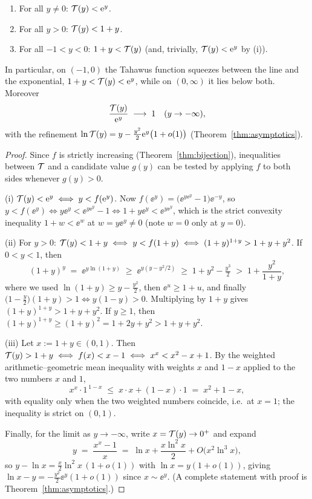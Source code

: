 \begin{theorem}\label{thm:sandwich}
\begin{enumerate}[label=\textup{(\roman*)}, leftmargin=2.4em]
    \item For all $y \ne 0$: $\mathcal{T}(y) < \mathrm{e}^{y}$.
    \item For all $y > 0$: $\mathcal{T}(y) < 1 + y$.
    \item For all $-1 < y < 0$: $1 + y < \mathcal{T}(y)$
    (and, trivially, $\mathcal{T}(y) < \mathrm{e}^{y}$ by (i)).
\end{enumerate}
In particular, on $(-1, 0)$ the Tahawus function squeezes between the
line and the exponential, $1 + y < \mathcal{T}(y) < \mathrm{e}^{y}$, while on
$(0, \infty)$ it lies below both. Moreover
\[
    \frac{\mathcal{T}(y)}{\mathrm{e}^{y}} \;\longrightarrow\; 1
    \quad (y \to -\infty),
\]
with the refinement
$\ln \mathcal{T}(y) = y - \tfrac{y^{2}}{2}\mathrm{e}^{y}\bigl(1 + o(1)\bigr)$
(Theorem~\ref{thm:asymptotics}).
\end{theorem}

\begin{proof}
Since $f$ is strictly increasing (Theorem~\ref{thm:bijection}),
inequalities between $\mathcal{T}$ and a candidate value $g(y)$ can be tested
by applying $f$ to both sides whenever $g(y) > 0$.

(i) $\mathcal{T}(y) < \mathrm{e}^{y} \iff y < f(\mathrm{e}^{y})$. Now
$f(\ee^{y}) = \bigl(\ee^{y\ee^{y}} - 1\bigr)\ee^{-y}$, so
$y < f(\ee^{y}) \iff y\ee^{y} < \ee^{y\ee^{y}} - 1 \iff
1 + y\ee^{y} < \ee^{y\ee^{y}}$, which is the strict convexity inequality
$1 + w < \ee^{w}$ at $w = y\ee^{y} \ne 0$ (note $w = 0$ only at
$y = 0$).

(ii) For $y > 0$: $\mathcal{T}(y) < 1 + y \iff y < f(1+y) \iff
(1+y)^{1+y} > 1 + y + y^{2}$. If $0 < y < 1$, then
\[
    (1+y)^{y} \;=\; \ee^{y \ln(1+y)}
    \;\ge\; \ee^{y(y - y^{2}/2)}
    \;\ge\; 1 + y^{2} - \tfrac{y^{3}}{2}
    \;>\; 1 + \frac{y^{2}}{1+y} ,
\]
where we used $\ln(1+y) \ge y - \tfrac{y^{2}}{2}$, then
$\ee^{u} \ge 1+u$, and finally $\bigl(1 - \tfrac{y}{2}\bigr)(1+y) > 1
\iff y(1-y) > 0$. Multiplying by $1+y$ gives
$(1+y)^{1+y} > 1 + y + y^{2}$. If $y \ge 1$, then
$(1+y)^{1+y} \ge (1+y)^{2} = 1 + 2y + y^{2} > 1 + y + y^{2}$.

(iii) Let $x := 1 + y \in (0, 1)$. Then
$\mathcal{T}(y) > 1 + y \iff f(x) < x - 1 \iff x^{x} < x^{2} - x + 1$. By the
weighted arithmetic--geometric mean inequality with weights
$x$ and $1-x$ applied to the two numbers $x$ and $1$,
\[
    x^{x}\cdot 1^{\,1-x} \;\le\; x\cdot x + (1-x)\cdot 1
    \;=\; x^{2} + 1 - x ,
\]
with equality only when the two weighted numbers coincide, i.e.\ at
$x = 1$; the inequality is strict on $(0,1)$.

Finally, for the limit as $y \to -\infty$, write $x = \mathcal{T}(y) \to 0^{+}$
and expand
\[
    y \;=\; \frac{x^{x} - 1}{x} \;=\; \ln x + \frac{x \ln^{2} x}{2} +
    O\bigl(x^{2}\ln^{3} x\bigr) ,
\]
so $y - \ln x = \tfrac{x}{2}\ln^{2}x\,(1 + o(1))$ with
$\ln x = y(1 + o(1))$, giving $\ln x - y = -\tfrac{y^{2}}{2}\ee^{y}
(1+o(1))$ since $x \sim \ee^{y}$. (A complete statement with proof is
Theorem~\ref{thm:asymptotics}.)
\end{proof}

